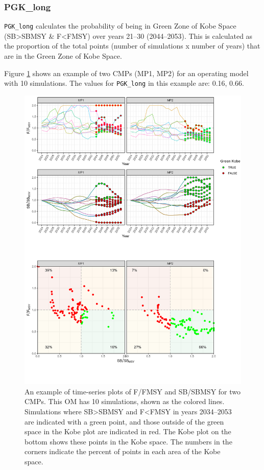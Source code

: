\documentclass[
]{article}
\begin{document}
\hypertarget{pgk_long}{%
\subsubsection{PGK\_long}\label{pgk_long}}

\texttt{PGK\_long} calculates the probability of being in Green Zone of Kobe Space (SB\textgreater SBMSY \& F\textless FMSY) over years 21--30 (2044--2053). This is calculated as the proportion of the total points (number of simulations x number of years) that are in the Green Zone of Kobe Space.

Figure \ref{fig:PGKlong} shows an example of two CMPs (MP1, MP2) for an operating model with 10 simulations. The values for \texttt{PGK\_long} in this example are: 0.16, 0.66.

\begin{figure}
\includegraphics[width=37.5in]{../../img/PMs/PGK_long} \caption{An example of time-series plots of F/FMSY and SB/SBMSY for two CMPs. This OM has 10 simulations, shown as the colored lines. Simulations where SB>SBMSY and F<FMSY in years 2034--2053 are indicated with a green point, and those outside of the green space in the Kobe plot are indicated in red. The Kobe plot on the bottom shows these points in the Kobe space. The numbers in the corners indicate the percent of points in each area of the Kobe space.}\label{fig:PGKlong}
\end{figure}
\end{document}

